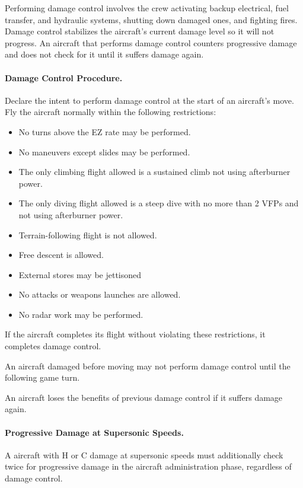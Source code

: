 \begin{advancedrules}
{Performing damage control involves the crew activating backup electrical, fuel transfer, and hydraulic systems, shutting down damaged ones, and fighting fires. Damage control stabilizes the aircraft's current damage level so it will not progress. An aircraft that performs damage control counters progressive damage and does not check for it until it suffers damage again.

\paragraph{Damage Control Procedure.} Declare the intent to perform damage control at the start of an aircraft's move. Fly the aircraft normally within the following restrictions:

\begin{itemize}
    \item No turns above the EZ rate may be performed.
    \item No maneuvers except slides may be performed.
    \item The only climbing flight allowed is a sustained climb not using afterburner power.
    \item The only diving flight allowed is a steep dive with no more than 2 VFPs and not using afterburner power.
    \item Terrain-following flight is not allowed.
    \item Free descent is allowed.
    \item External stores may be jettisoned
    \item No attacks or weapons launches are allowed.
    \item No radar work may be performed.
\end{itemize}

If the aircraft completes its flight without violating these restrictions, it completes damage control. 

An aircraft damaged before moving may not perform damage control until the following game turn. 

An aircraft loses the benefits of previous damage control if it suffers damage again.

\paragraph{Progressive Damage at Supersonic Speeds.} A aircraft with H or C damage at supersonic speeds must additionally check twice for progressive damage in the aircraft administration phase, regardless of damage control.

}
\end{advancedrules}

